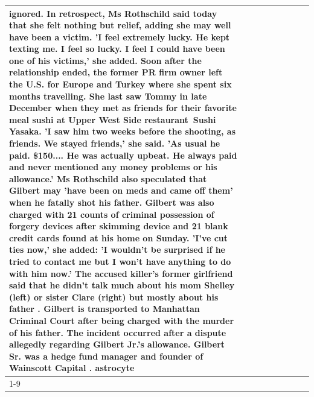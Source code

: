 \begin{table}[H]
\begin{tabular}{lllrlllll}
ignored. In retrospect, Ms Rothschild said today that she felt nothing but relief, adding she may well have been a victim. 'I feel extremely lucky. He kept texting me. I feel so lucky. I feel I could have been one of his victims,' she added. Soon after the relationship ended, the former PR firm owner left the U.S. for Europe and Turkey where she spent six months  travelling. She last saw Tommy in late December when they met as friends for their favorite meal sushi at Upper West Side restaurant Sushi Yasaka. 'I saw him two weeks before the shooting, as friends. We stayed friends,' she said. 'As usual he paid. \$150.... He was actually upbeat. He always paid and never mentioned any money problems or his allowance.' Ms Rothschild also speculated that Gilbert may 'have been on meds and came off them' when he fatally shot his father. Gilbert was also charged with 21 counts of criminal possession of forgery devices after skimming device and 21 blank credit cards found at his home on Sunday. 'I've cut ties now,' she added: 'I wouldn’t be surprised if he tried to contact me but I won’t have anything to do with him now.' The accused killer's former girlfriend said that he didn't talk much about his mom Shelley (left) or sister Clare (right) but mostly about his father . Gilbert is transported to Manhattan Criminal Court  after being charged with the murder of his father. The incident occurred after a dispute allegedly regarding Gilbert Jr.'s allowance. Gilbert Sr. was a hedge fund manager and founder of Wainscott Capital . astrocyte \\
\cline{1-9}

\end{tabular}
\end{table}
